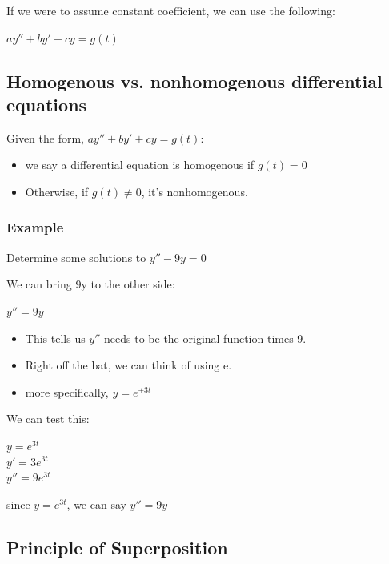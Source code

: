 \documentclass{article}
\begin{document}
If we were to assume constant coefficient, we can use the following:

\begin{center}
    $ay'' + by' + cy = g(t)$
\end{center}

\subsection{Homogenous vs. nonhomogenous differential equations}

Given the form, $ay'' + by' + cy = g(t)$:
\begin{itemize}
    \item we say a differential equation is homogenous if $g(t) = 0$
    \item Otherwise, if $g(t) \neq 0$, it's nonhomogenous.
\end{itemize}

\subsubsection{Example}

Determine some solutions to $y'' - 9y = 0$

We can bring 9y to the other side:

\begin{center}
    $y'' = 9y$
\end{center}

\begin{itemize}
    \item This tells us $y''$ needs to be the original function times 9.
    \item Right off the bat, we can think of using e.
    \item more specifically, $y = e^{\pm 3t}$
\end{itemize}

We can test this:

\begin{center}
    $y = e^{3t}$ \\
    $y' = 3e^{3t}$ \\
    $y'' = 9e^{3t}$ \\
\end{center}

since $y = e^{3t}$, we can say $y'' = 9y$ 

\subsection{Principle of Superposition}
\end{document}

